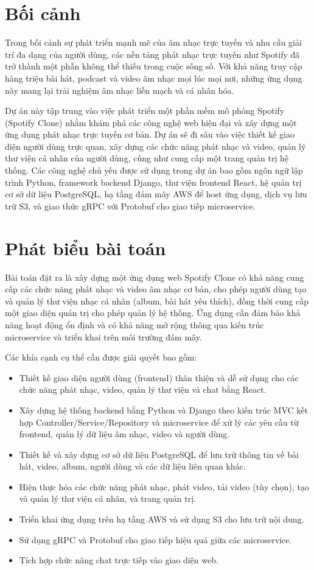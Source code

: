 \section{Bối cảnh}
\label{sec:intro_back}
Trong bối cảnh sự phát triển mạnh mẽ của âm nhạc trực tuyến và nhu cầu giải trí đa dạng của người dùng, các nền tảng phát nhạc trực tuyến như Spotify đã trở thành một phần không thể thiếu trong cuộc sống số. Với khả năng truy cập hàng triệu bài hát, podcast và video âm nhạc mọi lúc mọi nơi, những ứng dụng này mang lại trải nghiệm âm nhạc liền mạch và cá nhân hóa.

Dự án này tập trung vào việc phát triển một phần mềm mô phỏng Spotify (Spotify Clone) nhằm khám phá các công nghệ web hiện đại và xây dựng một ứng dụng phát nhạc trực tuyến cơ bản. Dự án sẽ đi sâu vào việc thiết kế giao diện người dùng trực quan, xây dựng các chức năng phát nhạc và video, quản lý thư viện cá nhân của người dùng, cũng như cung cấp một trang quản trị hệ thống. Các công nghệ chủ yếu được sử dụng trong dự án bao gồm ngôn ngữ lập trình Python, framework backend Django, thư viện frontend React, hệ quản trị cơ sở dữ liệu PostgreSQL, hạ tầng đám mây AWS để host ứng dụng, dịch vụ lưu trữ S3, và giao thức gRPC với Protobuf cho giao tiếp microservice.

\section{Phát biểu bài toán}
\label{sec:intro_prob_art}
Bài toán đặt ra là xây dựng một ứng dụng web Spotify Clone có khả năng cung cấp các chức năng phát nhạc và video âm nhạc cơ bản, cho phép người dùng tạo và quản lý thư viện nhạc cá nhân (album, bài hát yêu thích), đồng thời cung cấp một giao diện quản trị cho phép quản lý hệ thống. Ứng dụng cần đảm bảo khả năng hoạt động ổn định và có khả năng mở rộng thông qua kiến trúc microservice và triển khai trên môi trường đám mây.

Các khía cạnh cụ thể cần được giải quyết bao gồm:
\begin{itemize}
    \item Thiết kế giao diện người dùng (frontend) thân thiện và dễ sử dụng cho các chức năng phát nhạc, video, quản lý thư viện và chat bằng React.
    \item Xây dựng hệ thống backend bằng Python và Django theo kiến trúc MVC kết hợp Controller/Service/Repository và microservice để xử lý các yêu cầu từ frontend, quản lý dữ liệu âm nhạc, video và người dùng.
    \item Thiết kế và xây dựng cơ sở dữ liệu PostgreSQL để lưu trữ thông tin về bài hát, video, album, người dùng và các dữ liệu liên quan khác.
    \item Hiện thực hóa các chức năng phát nhạc, phát video, tải video (tùy chọn), tạo và quản lý thư viện cá nhân, và trang quản trị.
    \item Triển khai ứng dụng trên hạ tầng AWS và sử dụng S3 cho lưu trữ nội dung.
    \item Sử dụng gRPC và Protobuf cho giao tiếp hiệu quả giữa các microservice.
    \item Tích hợp chức năng chat trực tiếp vào giao diện web.
\end{itemize}


